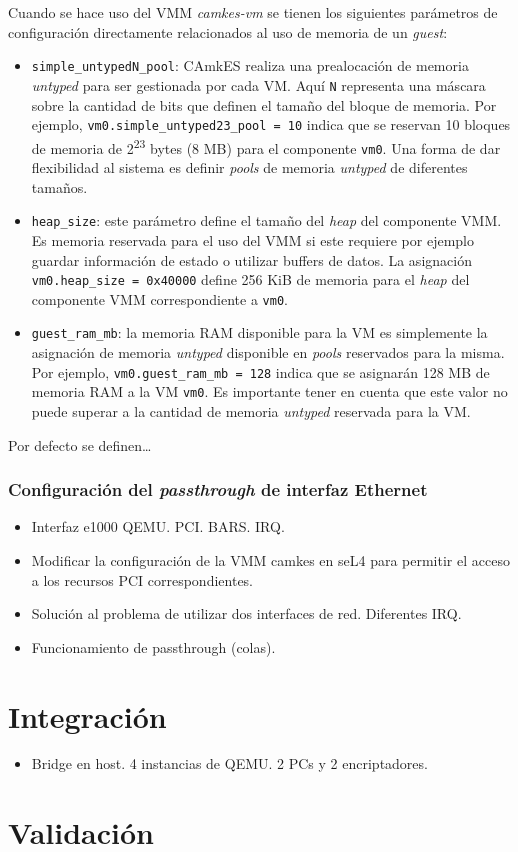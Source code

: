 Cuando se hace uso del VMM \textit{camkes-vm} se tienen los siguientes parámetros de configuración directamente relacionados al uso de memoria de un \textit{guest}:
\begin{itemize}
    \item \texttt{simple\_untypedN\_pool}: CAmkES realiza una prealocación de memoria \textit{untyped} para ser gestionada por cada VM. Aquí \texttt{N} representa una máscara sobre la cantidad de bits que definen el tamaño del bloque de memoria. Por ejemplo, \texttt{vm0.simple\_untyped23\_pool = 10} indica que se reservan 10 bloques de memoria de 2\textsuperscript{23} bytes (8 MB) para el componente \texttt{vm0}. Una forma de dar flexibilidad al sistema es definir \textit{pools} de memoria \textit{untyped} de diferentes tamaños. 
    \item \texttt{heap\_size}: este parámetro define el tamaño del \textit{heap} del componente VMM. Es memoria reservada para el uso del VMM si este requiere por ejemplo guardar información de estado o utilizar buffers de datos. La asignación \texttt{vm0.heap\_size = 0x40000} define 256 KiB de memoria para el \textit{heap} del componente VMM correspondiente a \texttt{vm0}.
    \item \texttt{guest\_ram\_mb}: la memoria RAM disponible para la VM es simplemente la asignación de memoria \textit{untyped} disponible en \textit{pools} reservados para la misma. Por ejemplo, \texttt{vm0.guest\_ram\_mb = 128} indica que se asignarán 128 MB de memoria RAM a la VM \texttt{vm0}. Es importante tener en cuenta que este valor no puede superar a la cantidad de memoria \textit{untyped} reservada para la VM.
\end{itemize}
Por defecto se definen\dots


\subsubsection{Configuración del \textit{passthrough} de interfaz Ethernet}
\begin{itemize}
    \item Interfaz e1000 QEMU. PCI. BARS. IRQ.
    \item Modificar la configuración de la VMM camkes en seL4 para permitir el acceso a los recursos PCI correspondientes.
    \item Solución al problema de utilizar dos interfaces de red. Diferentes IRQ.
    \item Funcionamiento de passthrough (colas).
\end{itemize}

\section{Integración}
\begin{itemize}
    \item Bridge en host. 4 instancias de QEMU. 2 PCs y 2 encriptadores.
\end{itemize}

\section{Validación} %
